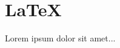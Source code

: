 \documentclass{article}
\begin{document}
  \section{\LaTeX}
  Lorem ipsum dolor sit amet...
\end{document}
